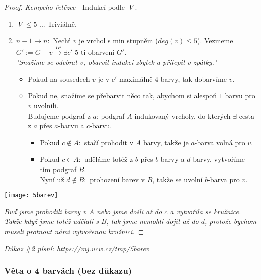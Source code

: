 \documentclass[10pt,a4paper]{article}
\begin{document}
\begin{proof} \textit{Kempeho řetězce} - Indukcí podle $|V|$.
    \begin{enumerate}[label=(\roman*)]
        \item $|V| \leq 5$ ... Triviálně.
        \item $n-1\to n:$ Nechť $v$ je vrchol s min stupněm ($deg(v) \leq 5$). Vezmeme $G':=G-v \xrightarrow{IP} \exists c'$ 5-ti obarvení $G'$.\\
        \textit{"Snažíme se odebrat $v$, obarvit indukcí zbytek a přilepit $v$ zpátky."}

        \begin{itemize}
            \item Pokud na sousedech $v$ je v $c'$ maximálně $4$ barvy, tak dobarvíme $v$.
            \item Pokud ne, snažíme se přebarvit něco tak, abychom si alespoň $1$ barvu pro $v$ uvolnili.\\
            Budujeme podgraf z $a$: podgraf $A$ indukovaný vrcholy, do kterých $\exists$ cesta z $a$ přes $a$-barvu a $c$-barvu. 
            \begin{itemize}
                \item Pokud $c\notin A:$ stačí prohodit v $A$ barvy, takže je $a$-barva volná pro $v$.
                \item Pokud $c\in A:$ uděláme totéž z $b$ přes $b$-barvy a $d$-barvy, vytvoříme tím podgraf $B$.\\
                Nyní už $d\notin B:$ prohození barev v $B$, takže se uvolní $b$-barva pro $v$.
            \end{itemize}
        \end{itemize}
    \end{enumerate}
    \begin{center}
        \texttt{[image: 5barev]}
    \end{center}
    \textit{Buď jsme prohodili barvy v $A$ nebo jsme došli až do $c$ a vytvořila se kružnice. Takže když jsme totéž udělali s $B$, tak jsme nemohli dojít až do $d$, protože bychom museli protnout námi vytvořenou kružnici.}

\end{proof}

\textit{Důkaz $\#$2 písní: \href{https://mj.ucw.cz/tmp/5barev}{https://mj.ucw.cz/tmp/5barev}}

\subsubsection{Věta o 4 barvách (bez důkazu)}
\end{document}
